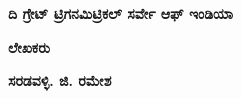 \thispagestyle{empty}

\textbf{ದಿ ಗ್ರೇಟ್ ಟ್ರಿಗನಮಿಟ್ರಿಕಲ್​ ಸರ್ವೇ ಆಫ್​ ಇಂಡಿಯಾ}

\begin{center}
\textbf{ಲೇಖಕರು}
\end{center}

\textbf{ಸರಡವಳ್ಳಿ. ಜಿ. ರಮೇಶ}

